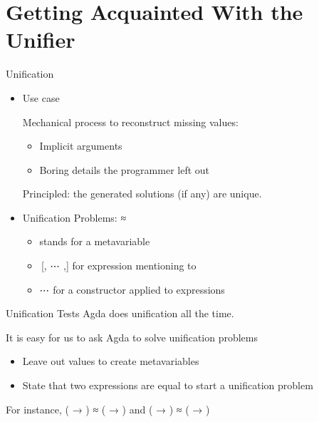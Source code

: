 \documentclass[compress,9pt]{beamer}
\begin{document}
\section{Getting Acquainted With the Unifier}

\begin{frame}{Unification}

  \begin{itemize}
    \item Use case\medskip

    Mechanical process to reconstruct missing values:
    \begin{itemize}
      \item Implicit arguments
      \item Boring details the programmer left out
    \end{itemize}

    Principled: the generated solutions (if any) are unique.

    \bigskip

    \item Unification Problems: { ≈ }\medskip

    \begin{itemize}
      \item {} stands for a metavariable
      \item {\,[, ⋯ ,]} for expression  mentioning  to 
      \item {  ⋯  for a} constructor  applied to  expressions
    \end{itemize}

  \end{itemize}
\end{frame}

\begin{frame}{Unification Tests}
  Agda does unification all the time.\medskip

  It is easy for us to ask Agda to solve unification problems

  \begin{itemize}
    \item Leave out values to create metavariables
    \item State that two expressions are equal to start a unification problem
  \end{itemize}

  \bigskip
  For instance, {( → ) ≈ ( → )} and
  {( → ) ≈ ( → )}

  \begin{minipage}{0.35\textwidth}
  \end{minipage}\begin{minipage}{0.55\textwidth}
  \end{minipage}
\end{frame}
\end{document}
